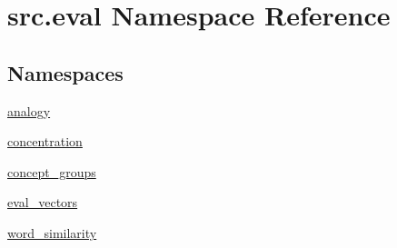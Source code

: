 \hypertarget{namespacesrc_1_1eval}{}\section{src.\+eval Namespace Reference}
\label{namespacesrc_1_1eval}
\subsection*{Namespaces}
\begin{DoxyCompactItemize}
\item 
 \hyperlink{namespacesrc_1_1eval_1_1analogy}{analogy}
\item 
 \hyperlink{namespacesrc_1_1eval_1_1concentration}{concentration}
\item 
 \hyperlink{namespacesrc_1_1eval_1_1concept__groups}{concept\+\_\+groups}
\item 
 \hyperlink{namespacesrc_1_1eval_1_1eval__vectors}{eval\+\_\+vectors}
\item 
 \hyperlink{namespacesrc_1_1eval_1_1word__similarity}{word\+\_\+similarity}
\end{DoxyCompactItemize}
